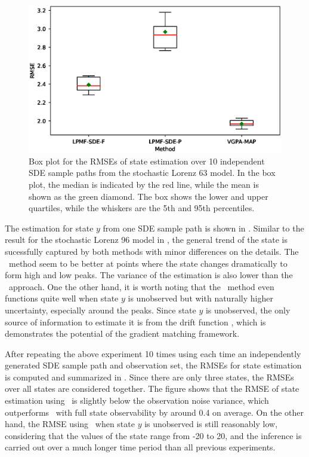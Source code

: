 \begin{figure}
    \centering
    \includegraphics[width=0.8\linewidth]{graphics/lorenz-63-states-boxplot}
    \caption{Box plot for the RMSEs of state estimation over 10 independent SDE sample paths from the stochastic Lorenz 63 model. In the box plot, the median is indicated by the red line, while the mean is shown as the green diamond. The box shows the lower and upper quartiles, while the whiskers are the 5th and 95th percentiles.}
    \label{fig-lorenz-63-state-boxplot}
\end{figure}

The estimation for state $y$ from one SDE sample path is shown in .
Similar to the result for the stochastic Lorenz 96 model in , the general trend of the state is sucessfully captured by both methods with minor differences on the details.
The \algovgpamap\ method seem to be better at points where the state changes dramatically to form high and low peaks.
The variance of the estimation is also lower than the \algolpmfsde\ approach.
One the other hand, it is worth noting that the \algolpmfsde\ method even functions quite well when state $y$ is unobserved but with naturally higher uncertainty, especially around the peaks.
Since state $y$ is unobserved, the only source of information to estimate it is from the drift function , which is demonstrates the potential of the gradient matching framework.

After repeating the above experiment 10 times using each time an independently generated SDE sample path and observation set, the RMSEs for state estimation is computed and summarized in .
Since there are only three states, the RMSEs over all states are considered together.
The figure shows that the RMSE of state estimation using \algovgpamap\ is slightly below the observation noise variance, which outperforms \algolpmfsde\ with full state observability by around 0.4 on average.
On the other hand, the RMSE using \algolpmfsde\ when state $y$ is unobserved is still reasonably low, considering that the values of the state range from -20 to 20, and the inference is carried out over a much longer time period than all previous experiments.

